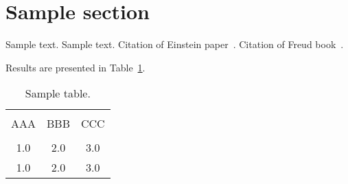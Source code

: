 \documentclass[jou,apacite]{apa6}
\author{Leon Lin}
\affiliation{\mbox{}}
\begin{document}
\maketitle    
                        
\section{Sample section}
Sample text. Sample text. Citation of Einstein 
paper~\cite{Einstein}. Citation of Freud book~\cite{Freud}.

Results are presented in Table~\ref{tab1}.
\begin{table}[!htb]
\caption{Sample table.}\label{tab1}
\begin{tabular}{ccc}
\hline\\[-1.5ex]
AAA & BBB & CCC \\[0.5ex]
\hline\\[-1.5ex]
1.0 & 2.0 & 3.0\\[0.5ex]
1.0 & 2.0 & 3.0\\[0.5ex]
\hline
\end{tabular}
\end{table}



\end{document}
